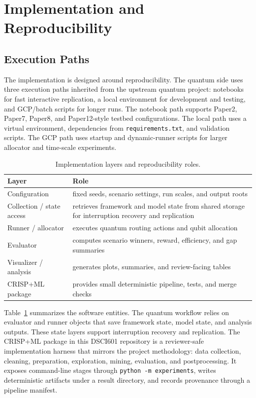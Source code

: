 \documentclass[conference]{IEEEtran}
\begin{document}
\section{Implementation and Reproducibility}
\subsection{Execution Paths}
The implementation is designed around reproducibility. The quantum side uses
three execution paths inherited from the upstream quantum project: notebooks
for fast interactive replication, a local environment for development and
testing, and GCP/batch scripts for longer runs. The notebook path supports
Paper2, Paper7, Paper8, and Paper12-style testbed configurations. The local
path uses a virtual environment, dependencies from \texttt{requirements.txt},
and validation scripts. The GCP path uses startup and dynamic-runner scripts
for larger allocator and time-scale experiments.

\begin{table}[t]
\caption{Implementation layers and reproducibility roles.}
\label{tab:implementation}
\centering
\small
\begin{tabular}{p{}p{}}
\toprule
\textbf{Layer} & \textbf{Role} \\
\midrule
Configuration & fixed seeds, scenario settings, run scales, and output roots \\
Collection / state access & retrieves framework and model state from shared storage for interruption recovery and replication \\
Runner / allocator & executes quantum routing actions and qubit allocation \\
Evaluator & computes scenario winners, reward, efficiency, and gap summaries \\
Visualizer / analysis & generates plots, summaries, and review-facing tables \\
CRISP+ML package & provides small deterministic pipeline, tests, and merge checks \\
\bottomrule
\end{tabular}
\end{table}

Table~\ref{tab:implementation} summarizes the software entities. The quantum
workflow relies on evaluator and runner objects that save framework state,
model state, and analysis outputs. These state layers support interruption
recovery and replication. The CRISP+ML package in this DSCI601 repository is
a reviewer-safe implementation harness that mirrors the project methodology:
data collection, cleaning, preparation, exploration, mining, evaluation, and
postprocessing. It exposes command-line stages through \texttt{python -m
experiments}, writes deterministic artifacts under a result directory, and
records provenance through a pipeline manifest.
\end{document}
